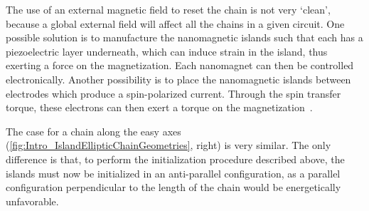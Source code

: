 \documentclass[11pt,a4paper,english,twoside]{article}
\begin{document}
The use of an external magnetic field to reset the chain is not very `clean', because a global external field will affect all the chains in a given circuit. One possible solution is to manufacture the nanomagnetic islands such that each has a piezoelectric layer underneath, which can induce strain in the island, thus exerting a force on the magnetization. Each nanomagnet can then be controlled electronically. Another possibility is to place the nanomagnetic islands between electrodes which produce a spin-polarized current. Through the spin transfer torque, these electrons can then exert a torque on the magnetization~\cite{SwitchingForced_EnergyEfficient,syllabus_PoAEaPD}. \par
The case for a chain along the easy axes (\cref{fig:Intro_IslandEllipticChainGeometries}, right) is very similar. The only difference is that, to perform the initialization procedure described above, the islands must now be initialized in an anti-parallel configuration, as a parallel configuration perpendicular to the length of the chain would be energetically unfavorable.
\end{document}
